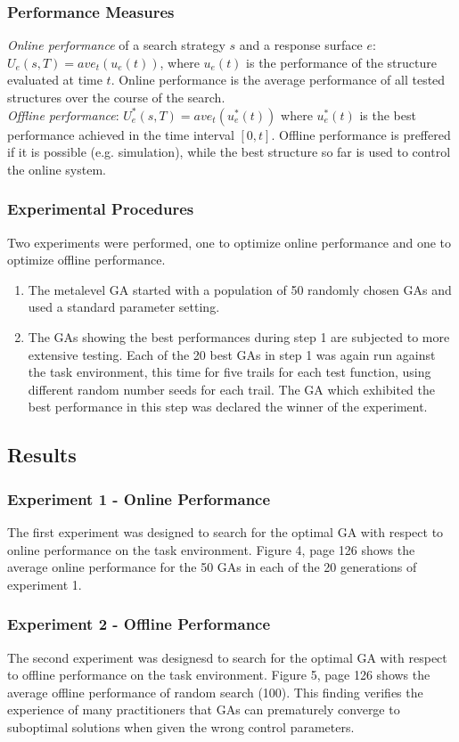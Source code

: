 \documentclass[12pt]{article}
\begin{document}
\subsubsection{Performance Measures}
\textit{Online performance} of a search strategy $s$ and a response surface $e$: $U_e(s,T) = ave_t(u_e(t))$, where $u_e(t)$ is the performance of the structure evaluated at time $t$. Online performance is the average performance of all tested structures over the course of the search.\\
\textit{Offline performance}: $U_e^*(s,T) = ave_t(u_e^*(t))$ where $u_e^*(t)$ is the best performance achieved in the time interval $[0,t]$. Offline performance is preffered if it is possible (e.g. simulation), while the best structure so far is used to control the online system.

\subsubsection{Experimental Procedures}
Two experiments were performed, one to optimize online performance and one to optimize offline performance.
\begin{enumerate}
\item The metalevel GA started with a population of 50 randomly chosen GAs and used a standard parameter setting.
\item The GAs showing the best performances during step 1 are subjected to more extensive testing. Each of the 20 best GAs in step 1 was again run against the task environment, this time for five trails for each test function, using different random number seeds for each trail. The GA which exhibited the best performance in this step was declared the winner of the experiment.
\end{enumerate}

\subsection{Results}
\subsubsection{Experiment 1 - Online Performance}
The first experiment was designed to search for the optimal GA with respect to online performance on the task environment. Figure 4, page 126 shows the average online performance for the 50 GAs in each of the 20 generations of experiment 1.

\subsubsection{Experiment 2 - Offline Performance}
The second experiment was designesd to search for the optimal GA with respect to offline performance on the task environment. Figure 5, page 126 shows the average offline performance of random search (100). This finding verifies the experience of many practitioners that GAs can prematurely converge to suboptimal solutions when given the wrong control parameters.
\end{document}
